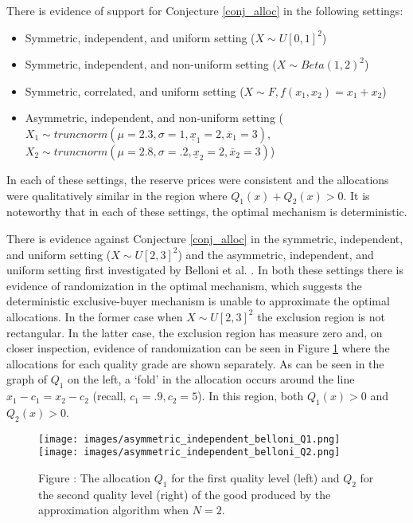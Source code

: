 There is evidence of support for Conjecture \ref{conj_alloc} in the following settings:
\begin{itemize}
    \item Symmetric, independent, and uniform setting ($X \sim U[0,1]^2$)
    \item Symmetric, independent, and non-uniform setting ($X \sim Beta(1,2)^2$)
    \item Symmetric, correlated, and uniform setting ($X \sim F, f(x_1,x_2) = x_1 + x_2$)
    \item Asymmetric, independent, and non-uniform setting ($X_1 \sim truncnorm(\mu=2.3, \sigma=1, \underline{x}_1=2, \overline{x}_1=3)$, $X_2 \sim truncnorm(\mu=2.8, \sigma=.2, \underline{x}_2=2, \overline{x}_2=3)$)
\end{itemize}
\noindent In each of these settings, the reserve prices were consistent and the allocations were qualitatively similar in the region where $Q_1(x) + Q_2(x) > 0$. It is noteworthy that in each of these settings, the optimal mechanism is deterministic. 

There is evidence against Conjecture \ref{conj_alloc} in the symmetric, independent, and uniform setting ($X \sim U[2,3]^2$) and the asymmetric, independent, and uniform setting first investigated by Belloni et al. \autocite*{belloni2010multidimensional}. In both these settings there is evidence of randomization in the optimal mechanism, which suggests the deterministic exclusive-buyer mechanism is unable to approximate the optimal allocations. In the former case when $X \sim U[2,3]^2$ the exclusion region is not rectangular. In the latter case, the exclusion region has measure zero and, on closer inspection, evidence of randomization can be seen in Figure \ref{fig:belloni_alloc_Q1} where the allocations for each quality grade are shown separately. As can be seen in the graph of $Q_1$ on the left, a `fold' in the allocation occurs around the line $x_1 - c_1 = x_2 - c_2$ (recall, $c_1=.9, c_2=5$). In this region, both $Q_1(x) > 0$ and $Q_2(x) > 0$.


\begin{figure}[H]
    \begin{center}
    \texttt{[image: images/asymmetric\_independent\_belloni\_Q1.png]}
    \texttt{[image: images/asymmetric\_independent\_belloni\_Q2.png]}
    \end{center}
    
    \vspace{1mm}
    \raggedright{\small {\sc Figure \thefig\label{fig:belloni_alloc_Q1}:} The allocation $Q_1$ for the first quality level (left) and $Q_2$ for the second quality level (right) of the good produced by the approximation algorithm when $N=2$.} 
\end{figure}

